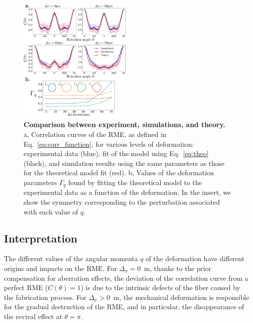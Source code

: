 \documentclass[aps,prl,twocolumn, amsmath,amssymb,superscriptaddress]{revtex4-2}
\begin{document}
\begin{figure}[ht]
\includegraphics[width=0.49\textwidth]{images/Fig3.pdf}
\caption{
    \textbf{Comparison between experiment, simulations, and theory.}
    a, Correlation curves of the RME, as defined in Eq.~\ref{eq:corr_function},
    for various levels of deformation:
    experimental data (blue),
    fit of the model using Eq.~\ref{eq:theo} (black),
    and simulation results using the same parameters as those for the theoretical model fit (red).
    b, Values of the deformation parameters $\Gamma_q$ found by fitting
    the theoretical model to the experimental data
    as a function of the deformation.
    In the insert, we show the symmetry corresponding to the perturbation associated with each value of $q$.
}
\label{fig:theoryVSexpVSsimu}
\end{figure}

\subsection*{Interpretation}


The different values of the angular momenta \(q\) of the deformation have different
origins and impacts on the RME.
For \(\Delta_x = 0\)~\textmu m,
thanks to the prior compensation for aberration effects,
the deviation of the correlation curve from a perfect RME
(\(C(\theta) = 1\))
is due to the intrinsic defects of the fiber
caused by the fabrication process.
For \(\Delta_x > 0\)~\textmu m,
the mechanical deformation is responsible for the gradual destruction
of the RME,
and in particular, the disappearance of the revival effect at \(\theta = \pi\).\\
\end{document}
